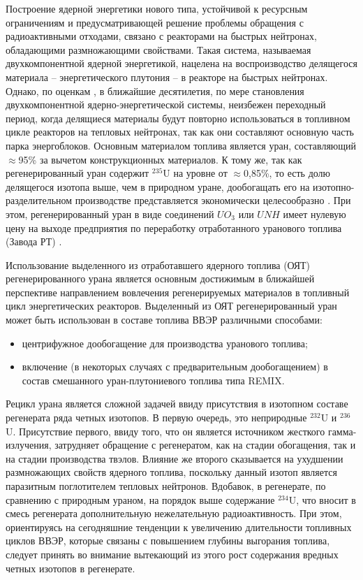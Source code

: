 {\actuality}
Построение ядерной энергетики нового типа, устойчивой к ресурсным ограничениям и предусматривающей решение проблемы обращения с радиоактивными отходами, связано с реакторами на быстрых нейтронах, обладающими размножающими свойствами. Такая система, называемая двухкомпонентной ядерной энергетикой, нацелена на воспроизводство делящегося материала -- энергетического  плутония -- в реакторе на быстрых нейтронах. Однако, по оценкам \cite{andrianovaPerspektivnyeToplivnyeZagruzki2015}, в ближайшие десятилетия, по мере становления двухкомпонентной ядерно-энергетической системы, неизбежен переходный период, когда делящиеся материалы будут повторно использоваться в топливном цикле реакторов на тепловых нейтронах, так как они составляют основную часть парка энергоблоков. Основным материалом топлива является уран, составляющий $\approx$95\% за вычетом конструкционных материалов. К тому же, так как регенерированный уран содержит $^{235}$U на уровне от $\approx$0,85\%, то есть долю делящегося изотопа выше, чем в природном уране, дообогащать его на изотопно-разделительном производстве представляется экономически целесообразно \cite{NikipelovNikipelovSudby}. При этом, регенерированный уран в виде соединений $UO_3$ или $UNH$ имеет нулевую цену на выходе предприятия по переработку отработанного уранового топлива (Завода РТ) \cite{gresleyEnrichingRecyclingUranium1988}.

Использование выделенного из отработавшего ядерного топлива (ОЯТ) регенерированного урана является основным достижимым в ближайшей перспективе направлением вовлечения регенерируемых материалов в топливный цикл энергетических реакторов. Выделенный из ОЯТ регенерированный уран может быть использован в составе топлива ВВЭР различными способами:
\begin{itemize}
  \item центрифужное дообогащение для производства уранового топлива;
  \item включение (в некоторых случаях с предварительным дообогащением) в состав смешанного уран-плутониевого топлива типа REMIX.
\end{itemize}


Рецикл урана является сложной задачей ввиду присутствия в изотопном составе регенерата ряда четных изотопов. В первую очередь, это неприродные $^{232}$U и $^{236}$U. Присутствие первого, ввиду того, что он является источником жесткого гамма-излучения, затрудняет обращение с регенератом, как на стадии обогащения, так и на стадии производства твэлов. Влияние же второго сказывается на ухудшении размножающих свойств ядерного топлива, поскольку данный изотоп является паразитным поглотителем тепловых нейтронов. Вдобавок, в регенерате, по сравнению с природным ураном, на порядок выше содержание $^{234}$U, что вносит в смесь регенерата дополнительную нежелательную радиоактивность. При этом, ориентируясь на сегодняшние тенденции к увеличению длительности топливных циклов ВВЭР, которые связаны с повышением глубины выгорания топлива, следует принять во внимание вытекающий из этого рост содержания вредных четных изотопов в регенерате.

